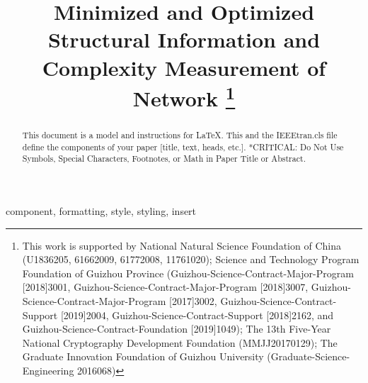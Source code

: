 \documentclass[10pt, conference, letterpaper]{IEEEtran}
\begin{document}
\title{Minimized and Optimized Structural Information and Complexity Measurement of Network
	\thanks{This work is supported by National Natural Science Foundation of China (U1836205, 61662009, 61772008, 11761020); Science and Technology Program Foundation of Guizhou Province (Guizhou-Science-Contract-Major-Program [2018]3001, Guizhou-Science-Contract-Major-Program [2018]3007, Guizhou-Science-Contract-Major-Program [2017]3002, Guizhou-Science-Contract-Support [2019]2004, Guizhou-Science-Contract-Support [2018]2162, and Guizhou-Science-Contract-Foundation [2019]1049); The 13th Five-Year National Cryptography Development Foundation (MMJJ20170129); The Graduate Innovation Foundation of Guizhou University (Graduate-Science-Engineering 2016068)}
}

\author{%
	
	
}

\maketitle

\begin{abstract}
This document is a model and instructions for \LaTeX.
This and the IEEEtran.cls file define the components of your paper [title, text, heads, etc.]. *CRITICAL: Do Not Use Symbols, Special Characters, Footnotes, 
or Math in Paper Title or Abstract.
\end{abstract}

\begin{IEEEkeywords}
component, formatting, style, styling, insert
\end{IEEEkeywords}
\end{document}
